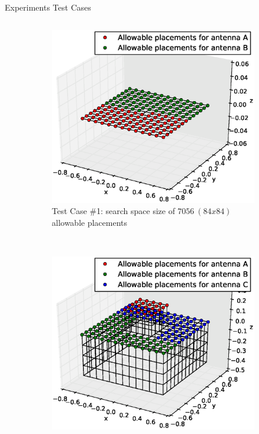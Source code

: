 \documentclass{beamer}
\begin{document}
\begin{frame}{Experiments Test Cases}
    \begin{columns}
        \begin{column}{.5\columnwidth}
            \begin{figure}
                \vspace*{-0.5cm}
                \centering
                \begin{subfigure}{\columnwidth}
                    \includegraphics[trim=0 30 0 50, clip,scale=0.25]{../paper/FIG/tc1_figure}%
                    \caption*{\tiny Test Case \#1: search space size of $7056~(84x84)$ allowable placements}%
                \end{subfigure}\hfill\\
                \begin{subfigure}{\columnwidth}
                    \includegraphics[trim=0 30 0 50, clip, scale=0.25]{../paper/FIG/tc3_figure}%

\end{subfigure}
\end{figure}
\end{column}
\end{columns}
\end{frame}
\end{document}
